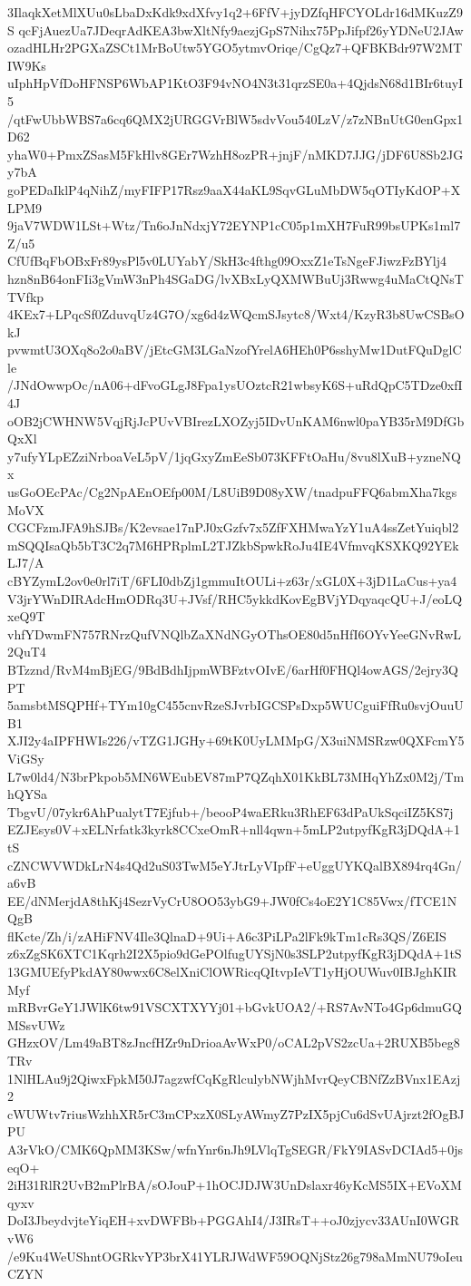 3IlaqkXetMlXUu0sLbaDxKdk9xdXfvy1q2+6FfV+jyDZfqHFCYOLdr16dMKuzZ9S
qcFjAuezUa7JDeqrAdKEA3bwXltNfy9aezjGpS7Nihx75PpJifpf26yYDNeU2JAw
ozadHLHr2PGXaZSCt1MrBoUtw5YGO5ytmvOriqe/CgQz7+QFBKBdr97W2MTIW9Ks
uIphHpVfDoHFNSP6WbAP1KtO3F94vNO4N3t31qrzSE0a+4QjdsN68d1BIr6tuyI5
/qtFwUbbWBS7a6cq6QMX2jURGGVrBlW5sdvVou540LzV/z7zNBnUtG0enGpx1D62
yhaW0+PmxZSasM5FkHlv8GEr7WzhH8ozPR+jnjF/nMKD7JJG/jDF6U8Sb2JGy7bA
goPEDaIklP4qNihZ/myFIFP17Rsz9aaX44aKL9SqvGLuMbDW5qOTIyKdOP+XLPM9
9jaV7WDW1LSt+Wtz/Tn6oJnNdxjY72EYNP1cC05p1mXH7FuR99bsUPKs1ml7Z/u5
CfUfBqFbOBxFr89ysPl5v0LUYabY/SkH3c4fthg09OxxZ1eTsNgeFJiwzFzBYlj4
hzn8nB64onFIi3gVmW3nPh4SGaDG/lvXBxLyQXMWBuUj3Rwwg4uMaCtQNsTTVfkp
4KEx7+LPqcSf0ZduvqUz4G7O/xg6d4zWQcmSJsytc8/Wxt4/KzyR3b8UwCSBsOkJ
pvwmtU3OXq8o2o0aBV/jEtcGM3LGaNzofYrelA6HEh0P6sshyMw1DutFQuDglCle
/JNdOwwpOc/nA06+dFvoGLgJ8Fpa1ysUOztcR21wbsyK6S+uRdQpC5TDze0xfI4J
oOB2jCWHNW5VqjRjJcPUvVBIrezLXOZyj5IDvUnKAM6nwl0paYB35rM9DfGbQxXl
y7ufyYLpEZziNrboaVeL5pV/1jqGxyZmEeSb073KFFtOaHu/8vu8lXuB+yzneNQx
usGoOEcPAc/Cg2NpAEnOEfp00M/L8UiB9D08yXW/tnadpuFFQ6abmXha7kgsMoVX
CGCFzmJFA9hSJBs/K2evsae17nPJ0xGzfv7x5ZfFXHMwaYzY1uA4ssZetYuiqbl2
mSQQIsaQb5bT3C2q7M6HPRplmL2TJZkbSpwkRoJu4IE4VfmvqKSXKQ92YEkLJ7/A
cBYZymL2ov0e0rl7iT/6FLI0dbZj1gmmuItOULi+z63r/xGL0X+3jD1LaCus+ya4
V3jrYWnDIRAdcHmODRq3U+JVsf/RHC5ykkdKovEgBVjYDqyaqcQU+J/eoLQxeQ9T
vhfYDwmFN757RNrzQufVNQlbZaXNdNGyOThsOE80d5nHfI6OYvYeeGNvRwL2QuT4
BTzznd/RvM4mBjEG/9BdBdhIjpmWBFztvOIvE/6arHf0FHQl4owAGS/2ejry3QPT
5amsbtMSQPHf+TYm10gC455cnvRzeSJvrbIGCSPsDxp5WUCguiFfRu0svjOuuUB1
XJI2y4aIPFHWIs226/vTZG1JGHy+69tK0UyLMMpG/X3uiNMSRzw0QXFcmY5ViGSy
L7w0ld4/N3brPkpob5MN6WEubEV87mP7QZqhX01KkBL73MHqYhZx0M2j/TmhQYSa
TbgvU/07ykr6AhPualytT7Ejfub+/beooP4waERku3RhEF63dPaUkSqciIZ5KS7j
EZJEsys0V+xELNrfatk3kyrk8CCxeOmR+nll4qwn+5mLP2utpyfKgR3jDQdA+1tS
cZNCWVWDkLrN4s4Qd2uS03TwM5eYJtrLyVIpfF+eUggUYKQalBX894rq4Gn/a6vB
EE/dNMerjdA8thKj4SezrVyCrU8OO53ybG9+JW0fCs4oE2Y1C85Vwx/fTCE1NQgB
flKcte/Zh/i/zAHiFNV4Ile3QlnaD+9Ui+A6c3PiLPa2lFk9kTm1cRs3QS/Z6EIS
z6xZgSK6XTC1Kqrh2I2X5pio9dGePOlfugUYSjN0s3SLP2utpyfKgR3jDQdA+1tS
13GMUEfyPkdAY80wwx6C8elXniClOWRicqQItvpIeVT1yHjOUWuv0IBJghKIRMyf
mRBvrGeY1JWlK6tw91VSCXTXYYj01+bGvkUOA2/+RS7AvNTo4Gp6dmuGQMSsvUWz
GHzxOV/Lm49aBT8zJncfHZr9nDrioaAvWxP0/oCAL2pVS2zcUa+2RUXB5beg8TRv
1NlHLAu9j2QiwxFpkM50J7agzwfCqKgRlculybNWjhMvrQeyCBNfZzBVnx1EAzj2
cWUWtv7riusWzhhXR5rC3mCPxzX0SLyAWmyZ7PzIX5pjCu6dSvUAjrzt2fOgBJPU
A3rVkO/CMK6QpMM3KSw/wfnYnr6nJh9LVlqTgSEGR/FkY9IASvDCIAd5+0jseqO+
2iH31RlR2UvB2mPlrBA/sOJouP+1hOCJDJW3UnDslaxr46yKcMS5IX+EVoXMqyxv
DoI3JbeydvjteYiqEH+xvDWFBb+PGGAhI4/J3IRsT++oJ0zjycv33AUnI0WGRvW6
/e9Ku4WeUShntOGRkvYP3brX41YLRJWdWF59OQNjStz26g798aMmNU79oIeuCZYN
